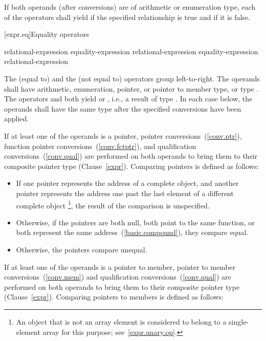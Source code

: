 \pnum
If both operands (after conversions) are of arithmetic or enumeration type, each
of the operators shall yield  if the specified relationship is true
and  if it is false.

[expr.eq]{Equality operators}%
%
%

\begin{bnf}
\br
    relational-expression\br
    equality-expression \terminal{==} relational-expression\br
    equality-expression \terminal{!=} relational-expression
\end{bnf}

\pnum
The \tcode{==} (equal to) and the \tcode{!=} (not equal to) operators
group left-to-right. The operands shall have arithmetic, enumeration, pointer,
or pointer to member type, or type . The operators
\tcode{==} and \tcode{!=} both yield  or , i.e., a
result of type . In each case below, the operands shall have the
same type after the specified conversions have been applied.

\pnum
{}%
%
If at least one of the operands is a pointer,
pointer conversions~(\ref{conv.ptr}),
function pointer conversions~(\ref{conv.fctptr}), and
qualification conversions~(\ref{conv.qual})
are performed on both operands to bring them to their composite pointer type
(Clause~\ref{expr}). Comparing pointers is defined as follows:

\begin{itemize}
\item
If one pointer represents the address of a complete object, and another
pointer represents the address one past the last element of a different
complete object \footnote{An object that is not an array element is
considered to belong to a single-element array for this purpose;
see~\ref{expr.unary.op}.}, the result of the comparison is unspecified.
\item
Otherwise, if the pointers are both null, both point to the same
%
function, or both represent the same address~(\ref{basic.compound}),
they compare equal.
\item
Otherwise, the pointers compare unequal.
\end{itemize}

\pnum
If at least one of the operands is a pointer to member, pointer to member
conversions~(\ref{conv.mem}) and qualification
conversions~(\ref{conv.qual}) are performed on both operands to bring them to
their composite pointer type (Clause~\ref{expr}).
Comparing pointers to members is defined as follows:

